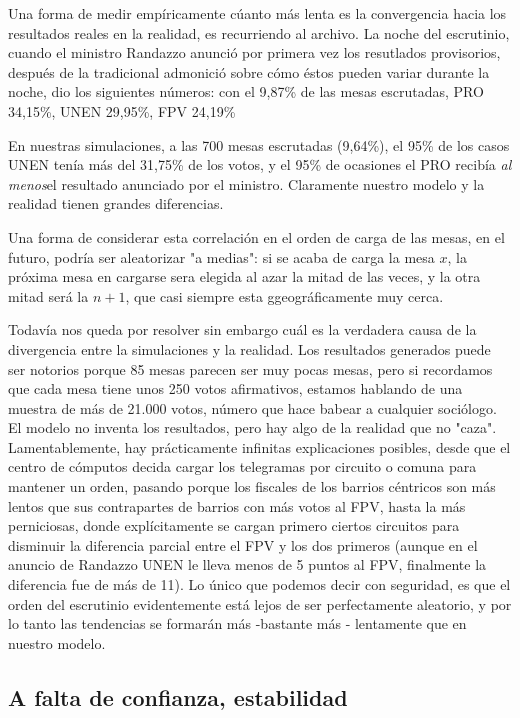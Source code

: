 \documentclass[12pt, a4paper]{article}
\begin{document}
Una forma de medir emp\'iricamente c\'uanto m\'as lenta es la convergencia hacia los resultados reales en la realidad, es recurriendo al archivo. La noche del escrutinio, cuando el ministro Randazzo anunci\'o por primera vez los resutlados provisorios, despu\'es de la tradicional admonici\'o sobre c\'omo \'estos pueden variar durante la noche, dio los siguientes n\'umeros: con el 9,87\% de las mesas escrutadas, PRO 34,15\%, UNEN 29,95\%, FPV 24,19\%

En nuestras simulaciones, a las 700 mesas escrutadas (9,64\%), el 95\% de los casos UNEN ten\'ia m\'as del 31,75\% de los votos, y el 95\% de ocasiones el PRO recib\'ia \emph{al menos}el resultado anunciado por el ministro. Claramente nuestro modelo y la realidad tienen grandes diferencias.

Una forma de considerar esta correlaci\'on en el orden de carga de las mesas, en el futuro, podr\'ia ser aleatorizar "a medias": si se acaba de carga la mesa $x$, la pr\'oxima mesa en cargarse sera elegida al azar la mitad de las veces, y la otra mitad ser\'a la $n+1$, que casi siempre esta ggeogr\'aficamente muy cerca.

Todav\'ia nos queda por resolver sin embargo cu\'al es la verdadera causa de la divergencia entre la simulaciones y la realidad. Los resultados generados puede ser notorios porque 85 mesas parecen ser muy pocas mesas, pero si recordamos que cada mesa tiene unos 250 votos afirmativos, estamos hablando de una muestra de m\'as de 21.000 votos, n\'umero que hace babear a cualquier soci\'ologo. El modelo no inventa los resultados, pero hay algo de la realidad que no "caza". Lamentablemente, hay pr\'acticamente infinitas explicaciones posibles, desde que el centro de c\'omputos decida cargar los telegramas por circuito o comuna para mantener un orden, pasando porque los fiscales de los barrios c\'entricos son m\'as lentos que sus contrapartes de barrios con m\'as votos al FPV, hasta la m\'as perniciosas, donde expl\'icitamente se cargan primero ciertos circuitos para disminuir la diferencia parcial entre el FPV y los dos primeros (aunque en el anuncio de Randazzo UNEN le lleva menos de 5 puntos al FPV, finalmente la diferencia fue de m\'as de 11). Lo \'unico que podemos decir con seguridad, es que el orden del escrutinio evidentemente est\'a lejos de ser perfectamente aleatorio, y por lo tanto las tendencias se formar\'an m\'as -bastante m\'as - lentamente que en nuestro modelo.

\subsection{A falta de confianza, estabilidad}
\end{document}
